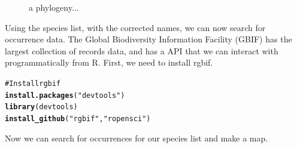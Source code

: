 \documentclass[letterpaper,superscriptaddress,showkeys,longbibliography,10pt]{revtex4-1}\usepackage{graphicx, color}
\makeatletter
\newcommand{\hlfunctioncall}[1]{\textcolor[rgb]{0.501960784313725,0,0.329411764705882}{\textbf{#1}}}%
\newcommand{\hlstring}[1]{\textcolor[rgb]{0.6,0.6,1}{#1}}%
\newcommand{\hlcomment}[1]{\textcolor[rgb]{0.180392156862745,0.6,0.341176470588235}{#1}}%
\newenvironment{kframe}{%
 \def\at@end@of@kframe{}%
 \ifinner\ifhmode%
  \def\at@end@of@kframe{\end{minipage}}%
  \begin{minipage}{\columnwidth}%
 \fi\fi%
 \def\FrameCommand##1{\hskip\@totalleftmargin \hskip-\fboxsep
 \colorbox{shadecolor}{##1}\hskip-\fboxsep
     \hskip-\linewidth \hskip-\@totalleftmargin \hskip\columnwidth}%
 \MakeFramed {\advance\hsize-\width
   \@totalleftmargin\z@ \linewidth\hsize
   \@setminipage}}%
 {\par\unskip\endMakeFramed%
 \at@end@of@kframe}
\newenvironment{knitrout}{}{} %
\makeatother
\begin{document}
\begin{figure}[!h]
\begin{knitrout}
{}



\end{knitrout}

\caption{a phylogeny...} 
\end{figure} 


Using the species list, with the corrected names, we can now search for occurrence data. The Global Biodiversity Information Facility (GBIF) has the largest collection of records data, and has a  API that we can interact with programmatically from R. First, we need to install rgbif.

\begin{knitrout}
\color{fgcolor}\begin{kframe}
\begin{alltt}
\hlcomment{# Install rgbif}
\hlfunctioncall{install.packages}(\hlstring{"devtools"})
\hlfunctioncall{library}(devtools)
\hlfunctioncall{install_github}(\hlstring{"rgbif"}, \hlstring{"ropensci"})
\end{alltt}
\end{kframe}
\end{knitrout}


Now we can search for occurrences for our species list and make a map.
\end{document}
